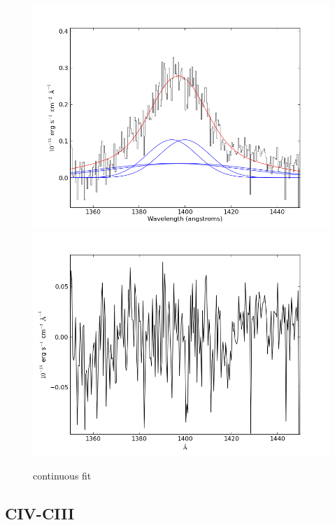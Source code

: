 \documentclass[usenatbib]{mn2e}
\begin{document}
\newpage


\begin{figure}
\begin{center}
\includegraphics[width=0.46\linewidth,angle=0]{SiIV_16.png}\\
\vspace{5mm}
\includegraphics[width=0.49\linewidth,angle=0]{SiIV_res_16.png}\\
\end{center} 
\caption{continuous fit \label{fig:landscape}}   
\end{figure}

\newpage





\subsection{CIV-CIII}
\end{document}
